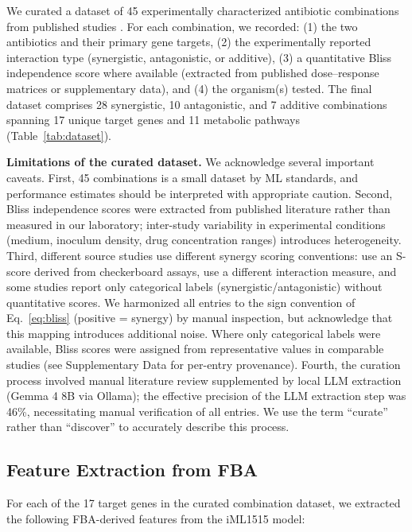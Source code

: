\documentclass[12pt,a4paper]{article}
\begin{document}
We curated a dataset of 45 experimentally characterized antibiotic combinations from published studies \citep{brochado2018, bollenbach2009, singh2021, ejim2011, farha2013, lazar2014, zheng2022}. For each combination, we recorded: (1) the two antibiotics and their primary gene targets, (2) the experimentally reported interaction type (synergistic, antagonistic, or additive), (3) a quantitative Bliss independence score where available (extracted from published dose--response matrices or supplementary data), and (4) the organism(s) tested. The final dataset comprises 28 synergistic, 10 antagonistic, and 7 additive combinations spanning 17 unique target genes and 11 metabolic pathways (Table~\ref{tab:dataset}).

\textbf{Limitations of the curated dataset.} We acknowledge several important caveats. First, 45 combinations is a small dataset by ML standards, and performance estimates should be interpreted with appropriate caution. Second, Bliss independence scores were extracted from published literature rather than measured in our laboratory; inter-study variability in experimental conditions (medium, inoculum density, drug concentration ranges) introduces heterogeneity. Third, different source studies use different synergy scoring conventions: \citet{brochado2018} use an S-score derived from checkerboard assays, \citet{bollenbach2009} use a different interaction measure, and some studies report only categorical labels (synergistic/antagonistic) without quantitative scores. We harmonized all entries to the sign convention of Eq.~\ref{eq:bliss} (positive = synergy) by manual inspection, but acknowledge that this mapping introduces additional noise. Where only categorical labels were available, Bliss scores were assigned from representative values in comparable studies (see Supplementary Data for per-entry provenance). Fourth, the curation process involved manual literature review supplemented by local LLM extraction (Gemma 4 8B via Ollama); the effective precision of the LLM extraction step was 46\%, necessitating manual verification of all entries. We use the term ``curate'' rather than ``discover'' to accurately describe this process.

\subsection{Feature Extraction from FBA}

For each of the 17 target genes in the curated combination dataset, we extracted the following FBA-derived features from the iML1515 model:
\end{document}
